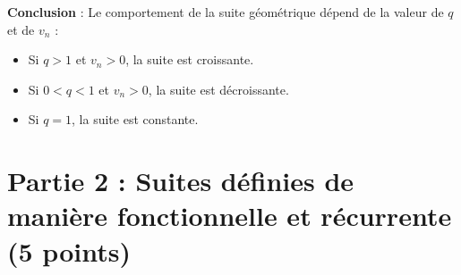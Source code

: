 \documentclass{exam}
\begin{document}
\begin{questions}
\begin{itemize}
  \end{itemize}

  \textbf{Conclusion} : Le comportement de la suite géométrique dépend de la valeur de \( q \) et de \( v_n \) :
  \begin{itemize}
      \item Si \( q > 1 \) et \( v_n > 0 \), la suite est croissante.
      \item Si \( 0 < q < 1 \) et \( v_n > 0 \), la suite est décroissante.
      \item Si \( q = 1 \), la suite est constante.
  \end{itemize}

\end{questions}

\section*{Partie 2 : Suites définies de manière fonctionnelle et récurrente (5 points)}
\end{document}

